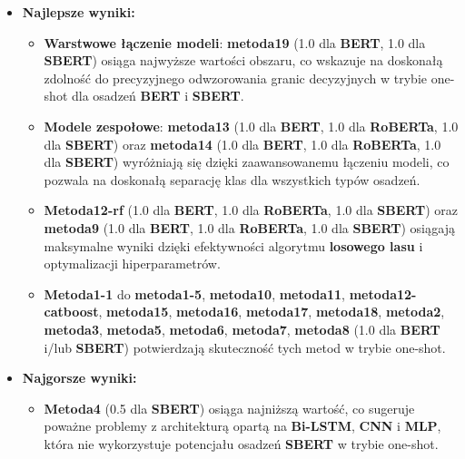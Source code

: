 \begin{itemize}
	\item \textbf{Najlepsze wyniki:}
	      \begin{itemize}
		      \item \textbf{Warstwowe łączenie modeli}: \textbf{metoda19} (1.0 dla \textbf{BERT}, 1.0 dla \textbf{SBERT}) osiąga najwyższe wartości obszaru, co wskazuje na doskonałą zdolność do precyzyjnego odwzorowania granic decyzyjnych w trybie one-shot dla osadzeń \textbf{BERT} i \textbf{SBERT}.
		      \item \textbf{Modele zespołowe}: \textbf{metoda13} (1.0 dla \textbf{BERT}, 1.0 dla \textbf{RoBERTa}, 1.0 dla \textbf{SBERT}) oraz \textbf{metoda14} (1.0 dla \textbf{BERT}, 1.0 dla \textbf{RoBERTa}, 1.0 dla \textbf{SBERT}) wyróżniają się dzięki zaawansowanemu łączeniu modeli, co pozwala na doskonałą separację klas dla wszystkich typów osadzeń.
		      \item \textbf{Metoda12-rf} (1.0 dla \textbf{BERT}, 1.0 dla \textbf{RoBERTa}, 1.0 dla \textbf{SBERT}) oraz \textbf{metoda9} (1.0 dla \textbf{BERT}, 1.0 dla \textbf{RoBERTa}, 1.0 dla \textbf{SBERT}) osiągają maksymalne wyniki dzięki efektywności algorytmu \textbf{losowego lasu} i optymalizacji hiperparametrów.
		      \item \textbf{Metoda1-1} do \textbf{metoda1-5}, \textbf{metoda10}, \textbf{metoda11}, \textbf{metoda12-catboost}, \textbf{metoda15}, \textbf{metoda16}, \textbf{metoda17}, \textbf{metoda18}, \textbf{metoda2}, \textbf{metoda3}, \textbf{metoda5}, \textbf{metoda6}, \textbf{metoda7}, \textbf{metoda8} (1.0 dla \textbf{BERT} i/lub \textbf{SBERT}) potwierdzają skuteczność tych metod w trybie one-shot.
	      \end{itemize}
	\item \textbf{Najgorsze wyniki:}
	      \begin{itemize}
		      \item \textbf{Metoda4} (0.5 dla \textbf{SBERT}) osiąga najniższą wartość, co sugeruje poważne problemy z architekturą opartą na \textbf{Bi-LSTM}, \textbf{CNN} i \textbf{MLP}, która nie wykorzystuje potencjału osadzeń \textbf{SBERT} w trybie one-shot.
	      \end{itemize}
\end{itemize}

